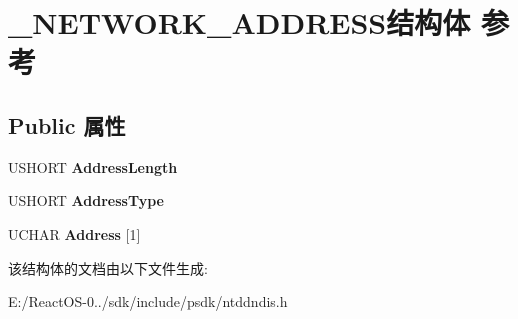 \hypertarget{struct___n_e_t_w_o_r_k___a_d_d_r_e_s_s}{}\section{\+\_\+\+N\+E\+T\+W\+O\+R\+K\+\_\+\+A\+D\+D\+R\+E\+S\+S结构体 参考}
\label{struct___n_e_t_w_o_r_k___a_d_d_r_e_s_s}
\subsection*{Public 属性}
\begin{DoxyCompactItemize}
\item 
\mbox{\label{struct___n_e_t_w_o_r_k___a_d_d_r_e_s_s_acefcae53269a82465b9c2a5edb8894ff}} 
U\+S\+H\+O\+RT {\bfseries Address\+Length}
\item 
\mbox{\label{struct___n_e_t_w_o_r_k___a_d_d_r_e_s_s_ac4a8433b85188033aec1f04baaeed8af}} 
U\+S\+H\+O\+RT {\bfseries Address\+Type}
\item 
\mbox{\label{struct___n_e_t_w_o_r_k___a_d_d_r_e_s_s_a24feef12e0bbe4c59b45bd7ef70436cc}} 
U\+C\+H\+AR {\bfseries Address} \mbox{[}1\mbox{]}
\end{DoxyCompactItemize}


该结构体的文档由以下文件生成\+:\begin{DoxyCompactItemize}
\item 
E\+:/\+React\+O\+S-\/0../sdk/include/psdk/ntddndis.\+h\end{DoxyCompactItemize}
